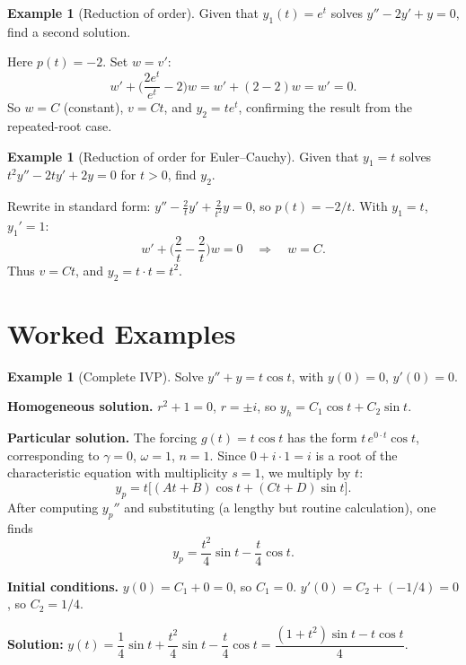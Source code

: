 \documentclass[12pt,a4paper,openany]{book}
\theoremstyle{definition}
\newtheorem{example}[definition]{Example}
\theoremstyle{plain}
\theoremstyle{remark}
\begin{document}
\begin{example}[Reduction of order]\label{ex:reduction-of-order}
Given that $y_1(t) = e^t$ solves $y'' - 2y' + y = 0$, find a second solution.

Here $p(t) = -2$. Set $w = v'$:
\[
  w' + \biggl(\frac{2e^t}{e^t} - 2\biggr)w = w' + (2 - 2)w = w' = 0.
\]
So $w = C$ (constant), $v = Ct$, and $y_2 = te^t$, confirming the result from
the repeated-root case.
\end{example}

\begin{example}[Reduction of order for Euler--Cauchy]\label{ex:reduction-euler}
Given that $y_1 = t$ solves $t^2 y'' - 2ty' + 2y = 0$ for $t > 0$, find $y_2$.

Rewrite in standard form: $y'' - \frac{2}{t}y' + \frac{2}{t^2}y = 0$,
so $p(t) = -2/t$. With $y_1 = t$, $y_1' = 1$:
\[
  w' + \biggl(\frac{2}{t} - \frac{2}{t}\biggr)w = 0
  \quad\Longrightarrow\quad w = C.
\]
Thus $v = Ct$, and $y_2 = t \cdot t = t^2$.
\end{example}

\section{Worked Examples}\label{sec:ch4-worked-examples}

\begin{example}[Complete IVP]\label{ex:complete-ivp}
Solve $y'' + y = t\cos t$, with $y(0) = 0$, $y'(0) = 0$.

\textbf{Homogeneous solution.} $r^2 + 1 = 0$, $r = \pm i$, so
$y_h = C_1\cos t + C_2\sin t$.

\textbf{Particular solution.} The forcing $g(t) = t\cos t$ has the form
$t\,e^{0\cdot t}\cos t$, corresponding to $\gamma = 0$, $\omega = 1$,
$n = 1$. Since $0 + i\cdot 1 = i$ is a root of the characteristic equation
with multiplicity $s = 1$, we multiply by $t$:
\[
  y_p = t\bigl[(At + B)\cos t + (Ct + D)\sin t\bigr].
\]
After computing $y_p''$ and substituting (a lengthy but routine calculation),
one finds
\[
  y_p = \frac{t^2}{4}\sin t - \frac{t}{4}\cos t.
\]

\textbf{Initial conditions.}
$y(0) = C_1 + 0 = 0$, so $C_1 = 0$.
$y'(0) = C_2 + (-1/4) = 0$, so $C_2 = 1/4$.

\textbf{Solution:}
$y(t) = \dfrac{1}{4}\sin t + \dfrac{t^2}{4}\sin t - \dfrac{t}{4}\cos t
= \dfrac{(1+t^2)\sin t - t\cos t}{4}$.
\end{example}
\end{document}
